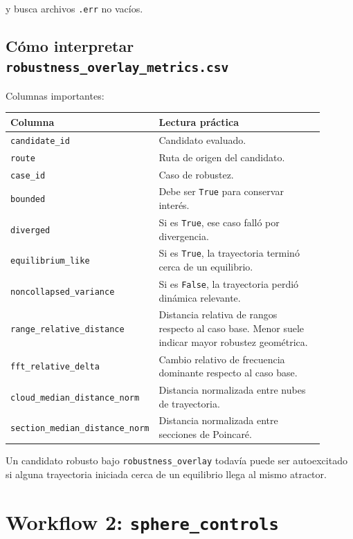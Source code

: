 \documentclass[11pt,letterpaper]{article}
\begin{document}
y busca archivos \texttt{.err} no vacíos.

\subsection{Cómo interpretar \texttt{robustness\_overlay\_metrics.csv}}

Columnas importantes:

\begin{center}
\begin{tabular}{L{0.34\linewidth}L{0.56\linewidth}}
\toprule
Columna & Lectura práctica \\
\midrule
\texttt{candidate\_id} & Candidato evaluado. \\
\texttt{route} & Ruta de origen del candidato. \\
\texttt{case\_id} & Caso de robustez. \\
\texttt{bounded} & Debe ser \texttt{True} para conservar interés. \\
\texttt{diverged} & Si es \texttt{True}, ese caso falló por divergencia. \\
\texttt{equilibrium\_like} & Si es \texttt{True}, la trayectoria terminó cerca de un equilibrio. \\
\texttt{noncollapsed\_variance} & Si es \texttt{False}, la trayectoria perdió dinámica relevante. \\
\texttt{range\_relative\_distance} & Distancia relativa de rangos respecto al caso base. Menor suele indicar mayor robustez geométrica. \\
\texttt{fft\_relative\_delta} & Cambio relativo de frecuencia dominante respecto al caso base. \\
\texttt{cloud\_median\_distance\_norm} & Distancia normalizada entre nubes de trayectoria. \\
\texttt{section\_median\_distance\_norm} & Distancia normalizada entre secciones de Poincaré. \\
\bottomrule
\end{tabular}
\end{center}

\begin{advertencia}
Un candidato robusto bajo \texttt{robustness\_overlay} todavía puede ser autoexcitado si alguna trayectoria iniciada cerca de un equilibrio llega al mismo atractor.
\end{advertencia}

\section{Workflow 2: \texttt{sphere\_controls}}
\end{document}
